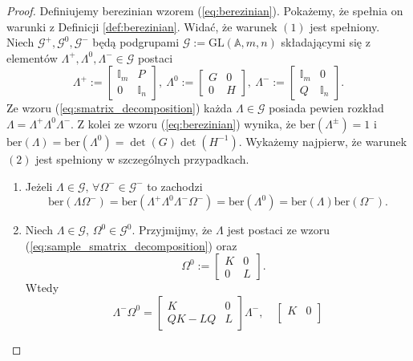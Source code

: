 \documentclass[11pt,a4paper]{report}
\theoremstyle{definition}
\newcommand{\ber}{\mathrm{ber}}
\newcommand{\I}{\mathbb{I}}
\begin{document}
\begin{proof}
	Definiujemy berezinian wzorem (\ref{eq:berezinian}). Pokażemy, że spełnia on warunki z Definicji \ref{def:berezinian}. Widać, że warunek $(1)$ jest spełniony. Niech $\mathcal{G}^{+}, \mathcal{G}^{0}, \mathcal{G}^{-}$ będą podgrupami $\mathcal{G}:=\mathrm{GL}(\mathbb{A},m,n)$ składającymi się z elementów $\Lambda^{+}, \Lambda^{0}, \Lambda^{-} \in \mathcal{G}$ postaci
	\begin{equation}
		\label{eq:sample_smatrix_decomposition}
		\Lambda^{+} := \begin{bmatrix}
		\I_m & P \\
		0 & \I_n
		\end{bmatrix}\!\!,\
		\Lambda^{0} := \begin{bmatrix}
		G & 0 \\
		0 & H
		\end{bmatrix}\!\!,\
		\Lambda^{-} := \begin{bmatrix}
		\I_m & 0 \\
		Q & \I_n
		\end{bmatrix}\!\!.
	\end{equation}
	Ze wzoru (\ref{eq:smatrix_decomposition}) każda $\Lambda \in \mathcal{G}$ posiada pewien rozkład $\Lambda = \Lambda^{+} \Lambda^0 \Lambda^{-}$. Z kolei ze wzoru (\ref{eq:berezinian}) wynika, że $\ber(\Lambda^{\pm})=1$ i $\ber(\Lambda) = \ber(\Lambda^0) = \det (G) \det (H^{-1})$. Wykażemy najpierw, że warunek $(2)$ jest spełniony w szczególnych przypadkach.
	\begin{enumerate}[1)]
		\item Jeżeli $\Lambda \in \mathcal{G},\, \forall \Omega^{-} \in \mathcal{G}^{-}$ to zachodzi $$\ber (\Lambda \Omega^{-}) = \ber(\Lambda^{+} \Lambda^0 \Lambda^{-} \Omega^{-}) = \ber (\Lambda^0) = \ber(\Lambda) \ber(\Omega^{-}).$$
		\item Niech $\Lambda \in \mathcal{G},\, \Omega^0 \in \mathcal{G}^0$. Przyjmijmy, że $\Lambda$ jest postaci ze wzoru (\ref{eq:sample_smatrix_decomposition}) oraz $$\quad \Omega^0 := \begin{bmatrix}
		      K & 0 \\
		      0 & L 
		\end{bmatrix}\!.$$ Wtedy $$\Lambda^- \Omega^0 = \begin{bmatrix}
		K & 0 \\
		QK - LQ & L 
		\end{bmatrix} \Lambda^-, \quad \begin{bmatrix}
		K & 0 \\

\end{bmatrix}$$
\end{enumerate}
\end{proof}
\end{document}
